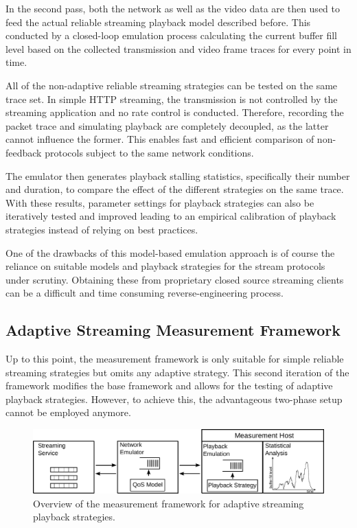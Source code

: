 In the second pass, both the network as well as the video data are then used to feed the actual reliable streaming playback model described before. This conducted by a closed-loop emulation process calculating the current buffer fill level based on the collected transmission and video frame traces for every point in time. 

All of the non-adaptive reliable streaming strategies can be tested on the same trace set. In simple \gls{HTTP} streaming, the transmission is not controlled by the streaming application and no rate control is conducted. Therefore, recording the packet trace and simulating playback are completely decoupled, as the latter cannot influence the former. This enables fast and efficient comparison of non-feedback protocols subject to the same network conditions.

The emulator then generates playback stalling statistics, specifically their number and duration, to compare the effect of the different strategies on the same trace. With these results, parameter settings for playback strategies can also be iteratively tested and improved leading to an empirical calibration of playback strategies instead of relying on best practices.

One of the drawbacks of this model-based emulation approach is of course the reliance on suitable models and playback strategies for the stream protocols under scrutiny. Obtaining these from proprietary closed source streaming clients can be a difficult and time consuming reverse-engineering process.


\subsection{Adaptive Streaming Measurement Framework}

Up to this point, the measurement framework is only suitable for simple reliable streaming strategies but omits any adaptive strategy. This second iteration of the framework modifies the base framework and allows for the testing of adaptive playback strategies. However, to achieve this, the advantageous two-phase setup cannot be employed anymore.

\begin{figure}[htb]
	\includegraphics[width=1.0\textwidth]{images/feedback-measurement-model.pdf}
	\caption{Overview of the measurement framework for adaptive streaming playback strategies.}
\label{c3:fig:framework-feedback}
\end{figure}

